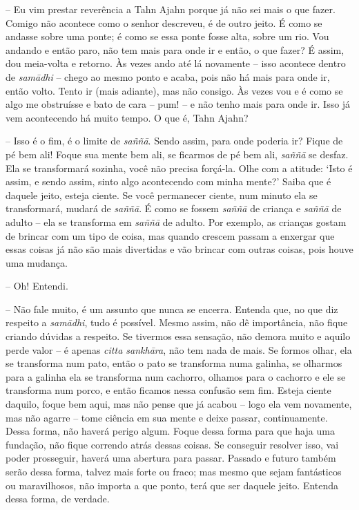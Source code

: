 -- Eu vim prestar reverência a Tahn Ajahn porque já não sei mais o que
fazer. Comigo não acontece como o senhor descreveu, é de outro jeito. É
como se andasse sobre uma ponte; é como se essa ponte fosse alta, sobre
um rio. Vou andando e então paro, não tem mais para onde ir e então, o
que fazer? É assim, dou meia-volta e retorno. Às vezes ando até lá
novamente -- isso acontece dentro de \emph{samādhi} -- chego ao mesmo
ponto e acaba, pois não há mais para onde ir, então volto. Tento ir
(mais adiante), mas não consigo. Às vezes vou e é como se algo me
obstruísse e bato de cara -- pum! -- e não tenho mais para onde ir. Isso
já vem acontecendo há muito tempo. O que é, Tahn Ajahn?

-- Isso é o fim, é o limite de \emph{saññā}. Sendo assim, para onde
poderia ir? Fique de pé bem ali! Foque sua mente bem ali, se ficarmos de
pé bem ali, \emph{saññā} se desfaz. Ela se transformará sozinha, você
não precisa forçá-la. Olhe com a atitude: `Isto é assim, e sendo assim,
sinto algo acontecendo com minha mente?' Saiba que é daquele jeito,
esteja ciente. Se você permanecer ciente, num minuto ela se
transformará, mudará de \emph{saññā}. É como se fossem \emph{saññā} de
criança e \emph{saññā} de adulto -- ela se transforma em \emph{saññā} de
adulto. Por exemplo, as crianças gostam de brincar com um tipo de coisa,
mas quando crescem passam a enxergar que essas coisas já não são mais
divertidas e vão brincar com outras coisas, pois houve uma mudança.

-- Oh! Entendi.

-- Não fale muito, é um assunto que nunca se encerra. Entenda que, no
que diz respeito a \emph{samādhi}, tudo é possível. Mesmo assim, não dê
importância, não fique criando dúvidas a respeito. Se tivermos essa
sensação, não demora muito e aquilo perde valor -- é apenas \emph{citta
sankhāra}, não tem nada de mais. Se formos olhar, ela se transforma num
pato, então o pato se transforma numa galinha, se olharmos para a
galinha ela se transforma num cachorro, olhamos para o cachorro e ele se
transforma num porco, e então ficamos nessa confusão sem fim. Esteja
ciente daquilo, foque bem aqui, mas não pense que já acabou -- logo ela
vem novamente, mas não agarre -- tome ciência em sua mente e deixe
passar, continuamente. Dessa forma, não haverá perigo algum. Foque dessa
forma para que haja uma fundação, não fique correndo atrás dessas
coisas. Se conseguir resolver isso, vai poder prosseguir, haverá uma
abertura para passar. Passado e futuro também serão dessa forma, talvez
mais forte ou fraco; mas mesmo que sejam fantásticos ou maravilhosos,
não importa a que ponto, terá que ser daquele jeito. Entenda dessa
forma, de verdade.

